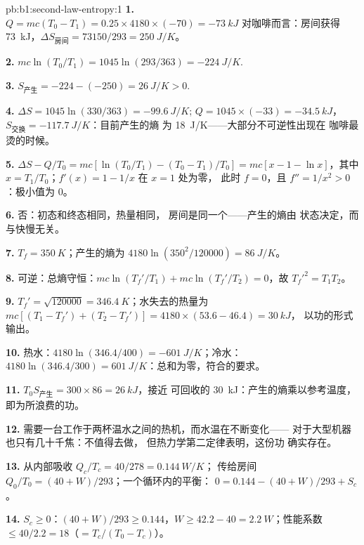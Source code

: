 \begin{solution}{pb:b1:second-law-entropy:1}
\textbf{1.} $Q = mc(T_0 - T_1) = 0.25 \times 4180 \times (-70) = \qty{-73}{kJ}$
对咖啡而言：房间获得 \qty{73}{kJ}，$\Delta S_{\text{房间}} = 73150/293
= \qty{+250}{J/K}$。

\textbf{2.} $mc\ln(T_0/T_1) = 1045\ln(293/363) = \qty{-224}{J/K}$.

\textbf{3.} $S_{\text{产生}} = -224 - (-250) = \qty{+26}{J/K} > 0$.

\textbf{4.} $\Delta S = 1045\ln(330/363) = \qty{-99.6}{J/K}$; $Q = 1045 \times
(-33) = \qty{-34.5}{kJ}$，$S_{\text{交换}} = \qty{-117.7}{J/K}$：目前产生的熵
为 \qty{18}{J/K}——大部分不可逆性出现在
咖啡最烫的时候。

\textbf{5.} $\Delta S - Q/T_0 = mc[\ln(T_0/T_1) - (T_0 - T_1)/T_0] = mc[x - 1 -
\ln x]$，其中 $x = T_1/T_0$；$f'(x) = 1 - 1/x$ 在 $x = 1$ 处为零，
此时 $f = 0$，且 $f'' = 1/x^2 > 0$：极小值为 $0$。

\textbf{6.} 否：初态和终态相同，热量相同，
房间是同一个——产生的熵由
状态决定，而与快慢无关。

\textbf{7.} $T_f = \qty{350}{K}$；产生的熵为 $4180\ln(350^2/120000) = \qty{86}{J/K}$。

\textbf{8.} 可逆：总熵守恒：$mc\ln(T_f'/T_1) + mc\ln(T_f'/
T_2) = 0$，故 $T_f'^2 = T_1T_2$。

\textbf{9.} $T_f' = \sqrt{120000} = \qty{346.4}{K}$；水失去的热量为 $mc[(T_1 -
T_f') + (T_2 - T_f')] = 4180 \times (53.6 - 46.4) = \qty{30}{kJ}$，
以功的形式输出。

\textbf{10.} 热水：$4180\ln(346.4/400) = \qty{-601}{J/K}$；冷水：$4180\ln(346.4/
300) = \qty{+601}{J/K}$：总和为零，符合的要求。

\textbf{11.} $T_0S_{\text{产生}} = 300 \times 86 = \qty{26}{kJ}$，接近
可回收的 \qty{30}{kJ}：产生的熵乘以参考温度，
即为所浪费的功。

\textbf{12.} 需要一台工作于两杯温水之间的热机，而水温在不断变化——
对于大型机器也只有几十千焦：不值得去做，
但热力学第二定律表明，这份功
确实存在。

\textbf{13.} 从内部吸收 $Q_c/T_c = 40/278 = \qty{0.144}{W/K}$；
传给房间 $Q_0/T_0 = (40 + W)/293$；一个循环内的平衡：
$0 = 0.144 - (40 + W)/293 + S_c$。

\textbf{14.} $S_c \geq 0$：$(40 + W)/293 \geq 0.144$，$W \geq 42.2 - 40 =
\qty{2.2}{W}$；性能系数 $\leq 40/2.2 = 18$（$= T_c/(T_0 - T_c)$）。


\end{solution}
